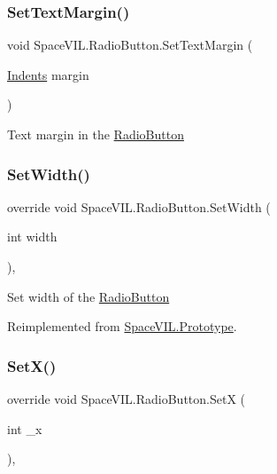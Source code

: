 \subsubsection{\texorpdfstring{Set\+Text\+Margin()}{SetTextMargin()}}
{\footnotesize\ttfamily void Space\+V\+I\+L.\+Radio\+Button.\+Set\+Text\+Margin (\begin{DoxyParamCaption}\item[{\mbox{\hyperlink{struct_space_v_i_l_1_1_decorations_1_1_indents}{Indents}}}]{margin }\end{DoxyParamCaption})\hspace{0.3cm}{\ttfamily [inline]}}



Text margin in the \mbox{\hyperlink{class_space_v_i_l_1_1_radio_button}{Radio\+Button}} 

\mbox{\label{class_space_v_i_l_1_1_radio_button_a1272cbc6fa73f98592a91b53d1aa280a}} 
\subsubsection{\texorpdfstring{Set\+Width()}{SetWidth()}}
{\footnotesize\ttfamily override void Space\+V\+I\+L.\+Radio\+Button.\+Set\+Width (\begin{DoxyParamCaption}\item[{int}]{width }\end{DoxyParamCaption})\hspace{0.3cm}{\ttfamily [inline]}, {\ttfamily [virtual]}}



Set width of the \mbox{\hyperlink{class_space_v_i_l_1_1_radio_button}{Radio\+Button}} 



Reimplemented from \mbox{\hyperlink{class_space_v_i_l_1_1_prototype_a6a4f1b9581f4d18f1c3a3e287d4b2a2b}{Space\+V\+I\+L.\+Prototype}}.

\mbox{\label{class_space_v_i_l_1_1_radio_button_ad7c30a94e2cb0ef1ee4b7678b7d322ef}} 
\subsubsection{\texorpdfstring{Set\+X()}{SetX()}}
{\footnotesize\ttfamily override void Space\+V\+I\+L.\+Radio\+Button.\+SetX (\begin{DoxyParamCaption}\item[{int}]{\+\_\+x }\end{DoxyParamCaption})\hspace{0.3cm}{\ttfamily [inline]}, {\ttfamily [virtual]}}



